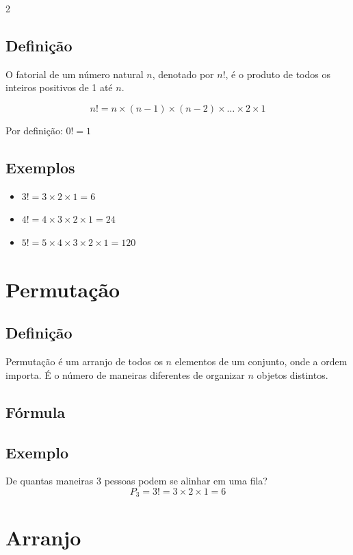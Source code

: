 \documentclass[11pt]{article}
\begin{document}
\begin{multicols}{2}
\subsection*{Definição}
O fatorial de um número natural $n$, denotado por $n!$, é o produto de todos os inteiros positivos de 1 até $n$.

\[
n! = n \times (n-1) \times (n-2) \times \ldots \times 2 \times 1
\]

Por definição: $0! = 1$

\subsection*{Exemplos}
\begin{itemize}
\item $3! = 3 \times 2 \times 1 = 6$
\item $4! = 4 \times 3 \times 2 \times 1 = 24$
\item $5! = 5 \times 4 \times 3 \times 2 \times 1 = 120$
\end{itemize}

\section*{Permutação}

\subsection*{Definição}
Permutação é um arranjo de todos os $n$ elementos de um conjunto, onde a ordem importa. É o número de maneiras diferentes de organizar $n$ objetos distintos.

\subsection*{Fórmula}

\subsection*{Exemplo}
De quantas maneiras 3 pessoas podem se alinhar em uma fila?
\[
P_3 = 3! = 3 \times 2 \times 1 = 6
\]

\section*{Arranjo}


\end{multicols}
\end{document}
